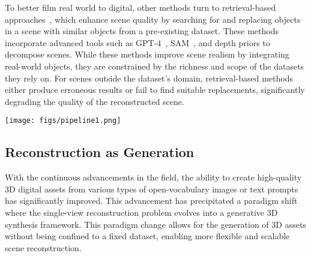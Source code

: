 
To better film real world to digital, other methods turn to retrieval-based approaches~\cite{langer2022sparc,gumeli2022roca,kuo2021patch2cad,gao2024diffcad,dai2024automated}, which enhance scene quality by searching for and replacing objects in a scene with similar objects from a pre-existing dataset. These methods incorporate advanced tools such as GPT-4~\cite{achiam2023gpt}, SAM~\cite{kirillov2023segment, ren2024grounded}, and depth priors to decompose scenes.
While these methods improve scene realism by integrating real-world objects, they are constrained by the richness and scope of the datasets they rely on. For scenes outside the dataset's domain, retrieval-based methods either produce erroneous results or fail to find suitable replacements, significantly degrading the quality of the reconstructed scene.

\begin{figure*} [ht]
  \centering
  \texttt{[image: figs/pipeline1.png]}
   \label{fig_overview1}
\end{figure*}



%
\subsection{Reconstruction as Generation}
With the continuous advancements in the field, the ability to create high-quality 3D digital assets from various types of open-vocabulary images or text prompts has significantly improved. This advancement has precipitated a paradigm shift where the single-view reconstruction problem evolves into a generative 3D synthesis framework.
This paradigm change allows for the generation of 3D assets without being confined to a fixed dataset, enabling more flexible and scalable scene reconstruction.

